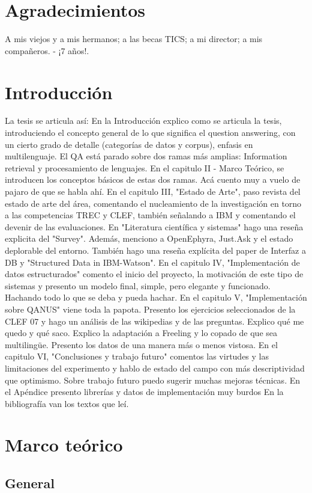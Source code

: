 \chapter{Agradecimientos}
A mis viejos y a mis hermanos; a las becas TICS; a mi director; a mis compañeros. - ¡7 años!.

\chapter{Introducción}
La tesis se articula así: En la Introducción explico como se articula la tesis, introduciendo el concepto general de lo que significa el question answering, con un cierto grado de detalle (categorías de datos y corpus), enfasis en multilenguaje. 
El QA está parado sobre dos ramas más amplias: Information retrieval y procesamiento de lenguajes. En el capitulo II - Marco Teórico, se introducen los conceptos básicos de estas dos ramas. Acá cuento muy a vuelo de pajaro de que se habla ahí.
En el capitulo III, "Estado de Arte", paso revista del estado de arte del área, comentando el nucleamiento de la investigación en torno a las competencias TREC y CLEF, también señalando a IBM y comentando el devenir de las evaluaciones. En "Literatura científica y sistemas" hago una reseña explicita del "Survey". Además, menciono a OpenEphyra, Just.Ask y el estado deplorable del entorno. También hago una reseña explícita del paper de Interfaz a DB y "Structured Data in IBM-Watson". 
En el capitulo IV, "Implementación de datos estructurados" comento el inicio del proyecto, la motivación de este tipo de sistemas y presento un modelo final, simple, pero elegante y funcionado. Hachando todo lo que se deba y pueda hachar. 
En el capitulo V, "Implementación sobre QANUS" viene toda la papota. Presento los ejercicios seleccionados de la CLEF 07 y hago un análisis de las wikipedias y de las preguntas. Explico qué me quedo y qué saco. Explico la adaptación a Freeling y lo copado de que sea multilingüe. Presento los datos de una manera más o menos vistosa.
En el capitulo VI, "Conclusiones y trabajo futuro" comentos las virtudes y las limitaciones del experimento y hablo de estado del campo con más descriptividad que optimismo. Sobre trabajo futuro puedo sugerir muchas mejoras técnicas. 
En el Apéndice presento librerías y datos de implementación muy burdos
En la bibliografía van los textos que leí.
\chapter{Marco teórico}
\section{General}
